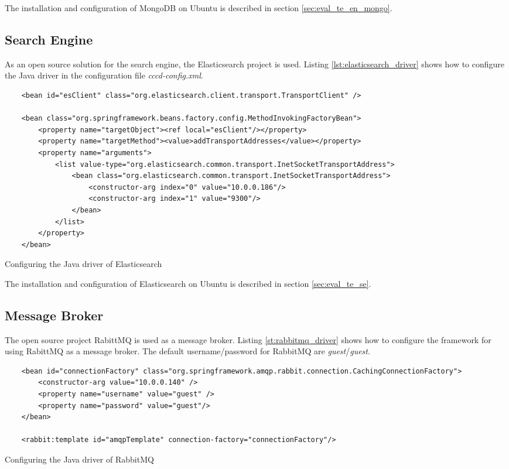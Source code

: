 The installation and configuration of MongoDB on Ubuntu is described in section \ref{sec:eval_te_en_mongo}.

\subsection{Search Engine\label{sec:impl_se_en}}
As an open source solution for the search engine, the Elasticsearch project is used. Listing \ref{lst:elasticsearch_driver} shows how to configure the Java driver in the configuration file \textit{cccd-config.xml}.

\begin{code}
\begin{verbatim}
	<bean id="esClient" class="org.elasticsearch.client.transport.TransportClient" />
	
	<bean class="org.springframework.beans.factory.config.MethodInvokingFactoryBean">
		<property name="targetObject"><ref local="esClient"/></property>
		<property name="targetMethod"><value>addTransportAddresses</value></property>
		<property name="arguments"> 
			<list value-type="org.elasticsearch.common.transport.InetSocketTransportAddress">
				<bean class="org.elasticsearch.common.transport.InetSocketTransportAddress">
					<constructor-arg index="0" value="10.0.0.186"/>
					<constructor-arg index="1" value="9300"/>
				</bean>
		 	</list>
		</property>
	</bean>
\end{verbatim}
\caption{Configuring the Java driver of Elasticsearch}
\label{lst:elasticsearch_driver}
\end{code}

The installation and configuration of Elasticsearch on Ubuntu is described in section \ref{sec:eval_te_se}.

\subsection{Message Broker\label{sec:impl_mb}}
The open source project RabittMQ is used as a message broker. Listing \ref{st:rabbitmq_driver}  shows how to configure the framework for using RabittMQ as a message broker. The default username/password for RabbitMQ are \textit{guest}/\textit{guest}.

\begin{code}
\begin{verbatim}
	<bean id="connectionFactory" class="org.springframework.amqp.rabbit.connection.CachingConnectionFactory">
	    <constructor-arg value="10.0.0.140" />
		<property name="username" value="guest" />
	    <property name="password" value="guest"/>
	</bean>
	
	<rabbit:template id="amqpTemplate" connection-factory="connectionFactory"/>
\end{verbatim}
\caption{Configuring the Java driver of RabbitMQ}
\label{lst:rabbitmq_driver}
\end{code}

